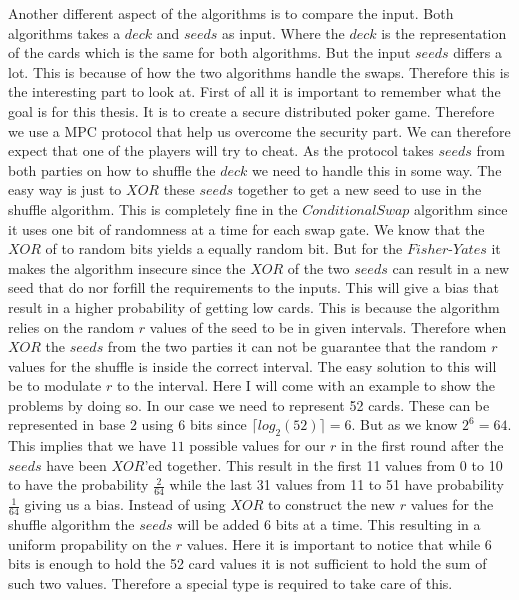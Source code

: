 Another different aspect of the algorithms is to compare the input. Both algorithms takes a $deck$ and $seeds$ as input. Where the $deck$ is the representation of the cards which is the same for both algorithms. But the input $seeds$ differs a lot. This is because of how the two algorithms handle the swaps. Therefore this is the interesting part to look at. First of all it is important to remember what the goal is for this thesis. It is to create a secure distributed poker game. Therefore we use a MPC protocol that help us overcome the security part. We can therefore expect that one of the players will try to cheat. As the protocol takes $seeds$ from both parties on how to shuffle the $deck$ we need to handle this in some way. The easy way is just to $XOR$ these $seeds$ together to get a new seed to use in the shuffle algorithm. This is completely fine in the $Conditional Swap$ algorithm since it uses one bit of randomness at a time for each swap gate. We know that the $XOR$ of to random bits yields a equally random bit. But for the $Fisher\text{-}Yates$ it makes the algorithm insecure since the $XOR$ of the two $seeds$ can result in a new seed that do nor forfill the requirements to the inputs. This will give a bias that result in a higher probability of getting low cards. This is because the algorithm relies on the random $r$ values of the seed to be in given intervals. Therefore when $XOR$ the $seeds$ from the two parties it can not be guarantee that the random $r$ values for the shuffle is inside the correct interval. The easy solution to this will be to modulate $r$ to the interval. Here I will come with an example to show the problems by doing so. In our case we need to represent 52 cards. These can be represented in base 2 using 6 bits since $\lceil{log_2(52)}\rceil=6$. But as we know $2^6=64$. This implies that we have $11$ possible values for our $r$ in the first round after the $seeds$ have been $XOR$'ed together. This result in the first 11 values from 0 to 10 to have the probability $\frac{2}{64}$ while the last 31 values from 11 to 51 have probability $\frac{1}{64}$ giving us a bias. 
Instead of using $XOR$ to construct the new $r$ values for the shuffle algorithm the $seeds$ will be added 6 bits at a time. This resulting in a uniform propability on the $r$ values. Here it is important to notice that while 6 bits is enough to hold the 52 card values it is not sufficient to hold the sum of such two values. Therefore a special type is required to take care of this.

\bigskip


